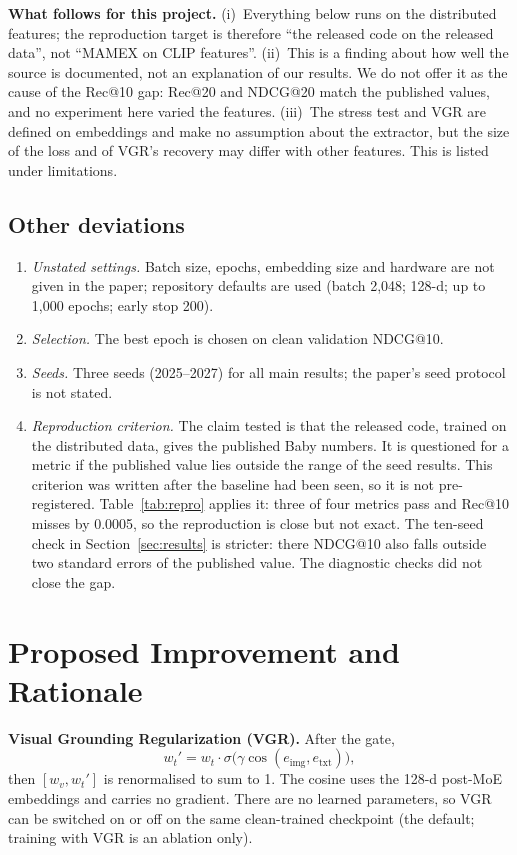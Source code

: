 \documentclass[conference]{IEEEtran}
\begin{document}
\textbf{What follows for this project.} (i)~Everything below runs on the distributed features; the reproduction target is therefore ``the released code on the released data'', not ``MAMEX on CLIP features''. (ii)~This is a finding about how well the source is documented, not an explanation of our results. We do not offer it as the cause of the Rec@10 gap: Rec@20 and NDCG@20 match the published values, and no experiment here varied the features. (iii)~The stress test and VGR are defined on embeddings and make no assumption about the extractor, but the size of the loss and of VGR's recovery may differ with other features. This is listed under limitations.

\subsection{Other deviations}
\begin{enumerate}
\item \emph{Unstated settings.} Batch size, epochs, embedding size and hardware are not given in the paper; repository defaults are used (batch 2,048; 128-d; up to 1,000 epochs; early stop 200).
\item \emph{Selection.} The best epoch is chosen on clean validation NDCG@10.
\item \emph{Seeds.} Three seeds (2025--2027) for all main results; the paper's seed protocol is not stated.
\item \emph{Reproduction criterion.} The claim tested is that the released code, trained on the distributed data, gives the published Baby numbers. It is questioned for a metric if the published value lies outside the range of the seed results. This criterion was written after the baseline had been seen, so it is not pre-registered. Table~\ref{tab:repro} applies it: three of four metrics pass and Rec@10 misses by 0.0005, so the reproduction is close but not exact. The ten-seed check in Section~\ref{sec:results} is stricter: there NDCG@10 also falls outside two standard errors of the published value. The diagnostic checks did not close the gap.
\end{enumerate}

\section{Proposed Improvement and Rationale}

\textbf{Visual Grounding Regularization (VGR).} After the gate,
\begin{equation}
w_t' = w_t \cdot \sigma\bigl(\gamma \cos(e_{\text{img}}, e_{\text{txt}})\bigr),
\end{equation}
then $[w_v, w_t']$ is renormalised to sum to 1. The cosine uses the 128-d post-MoE embeddings and carries no gradient. There are no learned parameters, so VGR can be switched on or off on the same clean-trained checkpoint (the default; training with VGR is an ablation only).
\end{document}
